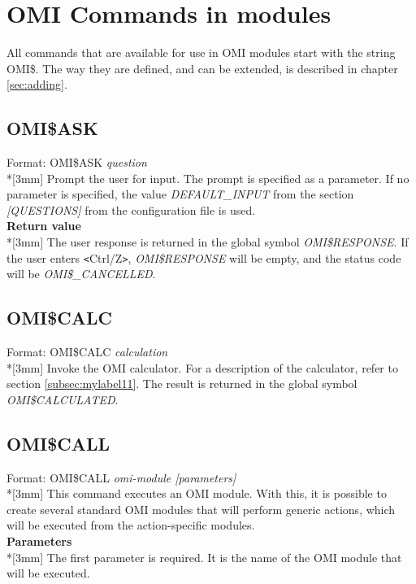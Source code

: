 \documentclass[a4paper]{book}
\newcommand{\lt}{\texttt{<}}
\newcommand{\gt}{\texttt{>}}
\renewcommand{\indent}{\hspace*{5mm}}
\begin{document}
\section{OMI Commands in modules}
\label{subsec:mylabel6}

All commands that are available for use in OMI modules start with the string 
OMI{\$}. The way they are defined, and can be extended, is described in 
chapter \ref{sec:adding}.

\subsection{OMI{\$}ASK}
\label{subsubsec:mylabel41}

\indent Format: \textsf{OMI{\$}ASK} \textit{question}\\*[3mm]
Prompt the user for input. The prompt is specified as a parameter. If no 
parameter is specified, the value \textsl{DEFAULT{\_}INPUT} from the section 
\textsl{[QUESTIONS]} from the configuration file is used.\\[3mm]
\textbf{Return value}\\*[3mm]
The user response is returned in the global symbol \textsl{OMI{\$}RESPONSE}. If the 
user enters \lt Ctrl/Z\gt, \textsl{OMI{\$}RESPONSE} will be empty, and the status code 
will be \textsl{OMI{\$}{\_}CANCELLED}.

\subsection{OMI{\$}CALC}
\label{subsubsec:mylabel42}

\indent Format: \textsf{OMI{\$}CALC \textit{calculation}}\\*[3mm]
Invoke the OMI calculator. For a description of the calculator, refer to 
section \ref{subsec:mylabel11}.
The result is returned in the global symbol \textsl{OMI{\$}CALCULATED}.

\subsection{OMI{\$}CALL}
\label{subsubsec:mylabel43}

\indent Format: \textsf{OMI{\$}CALL \textit{omi-module [parameters]}}\\*[3mm]
This command executes an OMI module. With this, it is possible to create 
several standard OMI modules that will perform generic actions, which will 
be executed from the action-specific modules.\\[3mm]
\textbf{Parameters}\\*[3mm]
The first parameter is required. It is the name of the OMI module that will 
be executed.
\end{document}
